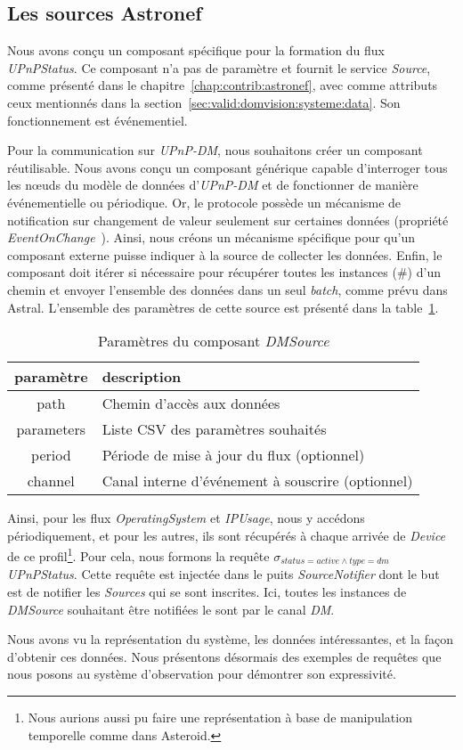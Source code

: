 \subsection{Les sources Astronef}
Nous avons conçu un composant spécifique pour la formation du flux \textit{UPnPStatus}. Ce composant n'a pas de paramètre et fournit le service \textit{Source}, comme présenté dans le chapitre~\ref{chap:contrib:astronef}, avec comme attributs ceux mentionnés dans la section~\ref{sec:valid:domvision:systeme:data}. Son fonctionnement est événementiel.

Pour la communication sur \textit{UPnP-DM}, nous souhaitons créer un composant réutilisable. Nous avons conçu un composant générique capable d'interroger tous les nœuds du modèle de données d'\textit{UPnP-DM} et de fonctionner de manière événementielle ou périodique. Or, le protocole possède un mécanisme de notification sur changement de valeur seulement sur certaines données (propriété \textit{EventOnChange}~\cite{UPnP:DM2}). Ainsi, nous créons un mécanisme spécifique pour qu'un composant externe puisse indiquer à la source de collecter les données. Enfin, le composant doit itérer si nécessaire pour récupérer toutes les instances (\#) d'un chemin et envoyer l'ensemble des données dans un seul \textit{batch}, comme prévu dans Astral. L'ensemble des paramètres de cette source est présenté dans la table~\ref{tab:valid:domvision:dmsource}.

\begin{table}[ht]
    \centering
    \begin{tabular}{cl}
        paramètre & description \\ \midrule
        path & Chemin d'accès aux données \\
        parameters & Liste CSV des paramètres souhaités \\
        period & Période de mise à jour du flux (optionnel) \\
        channel & Canal interne d'événement à souscrire (optionnel)
    \end{tabular}
    \caption{Paramètres du composant \textit{DMSource}}\label{tab:valid:domvision:dmsource}
\end{table}

Ainsi, pour les flux \textit{OperatingSystem} et \textit{IPUsage}, nous y accédons périodiquement, et pour les autres, ils sont récupérés à chaque arrivée de \textit{Device} de ce profil\footnote{Nous aurions aussi pu faire une représentation à base de manipulation temporelle comme dans Asteroid.}. Pour cela, nous formons la requête $\sigma_{status=active\wedge type=dm}$ \textit{UPnPStatus}. Cette requête est injectée dans le puits \textit{SourceNotifier} dont le but est de notifier les \textit{Sources} qui se sont inscrites. Ici, toutes les instances de \textit{DMSource} souhaitant être notifiées le sont par le canal \textit{DM}.

Nous avons vu la représentation du système, les données intéressantes, et la façon d’obtenir ces données. Nous présentons désormais des exemples de requêtes que nous posons au système d'observation pour démontrer son expressivité.
